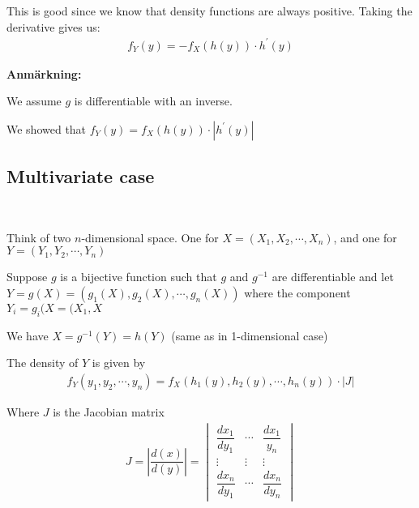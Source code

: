 \noindent This is good since we know that density functions are always positive. Taking the derivative gives us:
\begin{equation*}
  \begin{gathered}
    f_Y(y) = -f_X(h(y))\cdot h^{\prime}(y)
  \end{gathered}
\end{equation*}
\par\bigskip
\noindent\textbf{Anmärkning:}\par
\noindent We assume $g$ is differentiable with an inverse.
\par\bigskip
\noindent We showed that $f_Y(y) = f_X(h(y))\cdot \left|h^{\prime}(y)\right|$
\par\bigskip
\subsection{Multivariate case}\hfill\\\par
\noindent Think of two $n$-dimensional space. One for $X = (X_1,X_2,\cdots,X_n)$, and one for $Y= (Y_1,Y_2,\cdots,Y_n)$
\par\bigskip
\noindent Suppose $g$ is a bijective function such that $g$ and $g^{-1}$ are differentiable and let $Y = g(X) = (g_1(X),g_2(X),\cdots, g_n(X))$ where the component $Y_i = g_i(X = (X_1,X$
\par\bigskip
\noindent We have $X = g^{-1}(Y) = h(Y)$ (same as in 1-dimensional case)
\par\bigskip
\begin{theo}{}
  The density of $Y$ is given by
  \begin{equation*}
    \begin{gathered}
      f_Y(y_1,y_2,\cdots,y_n) = f_X(h_1(y),h_2(y),\cdots,h_n(y))\cdot\left|J\right|
    \end{gathered}
  \end{equation*}\par
  \noindent Where $J$ is the Jacobian matrix
  \begin{equation*}
    \begin{gathered}
      J = \left|\dfrac{d(x)}{d(y)}\right| = \begin{vmatrix}\dfrac{dx_1}{dy_1}&\cdots&\dfrac{dx_1}{y_n}\\\vdots&\vdots&\vdots\\\dfrac{dx_n}{dy_1}&\cdots&\dfrac{dx_n}{dy_n}\end{vmatrix}
    \end{gathered}
  \end{equation*}
\end{theo}
